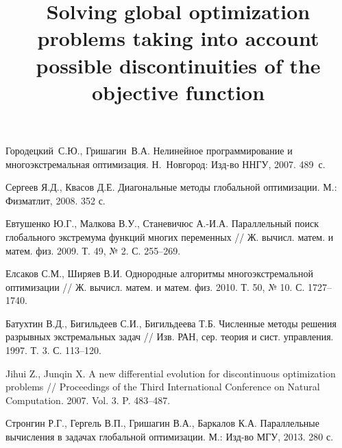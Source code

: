 \documentclass[11pt, oneside, a4paper]{article}
\begin{document}
\begin{biblio}






Городецкий~С.Ю., Гришагин~В.А. Нелинейное программирование и многоэкстремальная оптимизация. Н.~Новгород: Изд-во ННГУ, 2007. 489~с.

Сергеев Я.Д., Квасов Д.Е. Диагональные методы глобальной оптимизации. М.: Физматлит, 2008. 352 с. 

Евтушенко Ю.Г., Малкова В.У., Станевичюс А.-И.А. Параллельный поиск глобального экстремума функций многих переменных // Ж. вычисл. матем. и матем. физ. 2009. Т. 49, № 2.  С. 255--269.

Елсаков С.М., Ширяев В.И. Однородные алгоритмы многоэкстремальной оптимизации // Ж. вычисл. матем. и матем. физ. 2010. Т. 50, № 10. С. 1727--1740.

Батухтин В.Д., Бигильдеев С.И., Бигильдеева Т.Б. Численные методы решения разрывных экстремальных задач // Изв. РАН, сер. теория и сист. управления. 1997. Т. 3. С. 113--120.

Jihui Z., Junqin X. A new differential evolution for discontinuous optimization problems // 
Proceedings of the Third International Conference on Natural Computation. 2007. Vol. 3. P. 483--487.

Стронгин Р.Г., Гергель В.П., Гришагин В.А., Баркалов К.А. Параллельные вычисления в задачах глобальной оптимизации. М.: Изд-во МГУ, 2013. 280 с.




\end{biblio}


\title{Solving global optimization problems taking into account possible discontinuities of the objective function}

\end{document}
